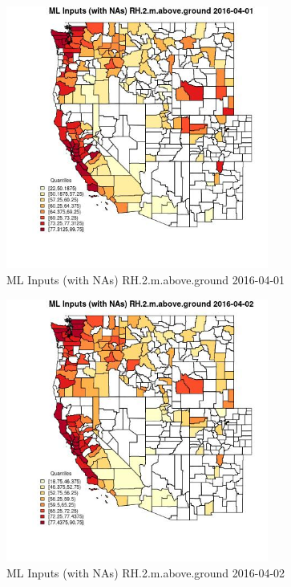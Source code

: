 \begin{figure} 
\centering  
\includegraphics[width=0.77\textwidth]{Code_Outputs/Report_ML_input_PM25_Step4_part_e_de_duplicated_aveswNAs_CountyRH2mabovegroundMean2016-04-01_2016-04-01.jpg} 
\caption{\label{fig:Report_ML_input_PM25_Step4_part_e_de_duplicated_aveswNAsCountyRH2mabovegroundMean2016-04-01_2016-04-01}ML Inputs (with NAs) RH.2.m.above.ground 2016-04-01} 
\end{figure} 
 

\begin{figure} 
\centering  
\includegraphics[width=0.77\textwidth]{Code_Outputs/Report_ML_input_PM25_Step4_part_e_de_duplicated_aveswNAs_CountyRH2mabovegroundMean2016-04-02_2016-04-02.jpg} 
\caption{\label{fig:Report_ML_input_PM25_Step4_part_e_de_duplicated_aveswNAsCountyRH2mabovegroundMean2016-04-02_2016-04-02}ML Inputs (with NAs) RH.2.m.above.ground 2016-04-02} 
\end{figure} 
 


